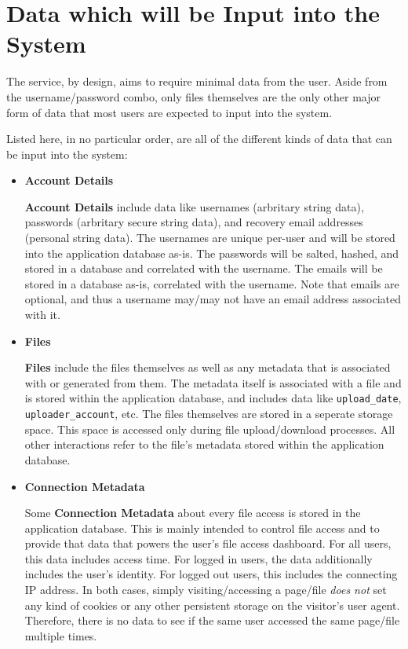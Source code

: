 \documentclass[12pt,a4paper]{report}
\begin{document}
\section{Data which will be Input into the System}\label{sec:data_which_will_be_input_into_system}
The service, by design, aims to require minimal data from the user. Aside from the username/password combo, only files themselves are the only other major form of data that most users are expected to input into the system.

Listed here, in no particular order, are all of the different kinds of data that can be input into the system:
\begin{itemize}
	\item \textbf{Account Details}

	      \textbf{Account Details} include data like usernames (arbritary string data), passwords (arbritary secure string data), and recovery email addresses (personal string data). The usernames are unique per-user and will be stored into the application database as-is. The passwords will be salted, hashed, and stored in a database and correlated with the username. The emails will be stored in a database as-is, correlated with the username. Note that emails are optional, and thus a username may/may not have an email address associated with it.

	\item \textbf{Files}

	      \textbf{Files} include the files themselves as well as any metadata that is associated with or generated from them. The metadata itself is associated with a file and is stored within the application database, and includes data like \texttt{upload\_date}, \texttt{uploader\_account}, etc. The files themselves are stored in a seperate storage space. This space is accessed only during file upload/download processes. All other interactions refer to the file's metadata stored within the application database.

	\item \textbf{Connection Metadata}

	      Some \textbf{Connection Metadata} about every file access is stored in the application database. This is mainly intended to control file access and to provide that data that powers the user's file access dashboard. For all users, this data includes access time. For logged in users, the data additionally includes the user's identity. For logged out users, this includes the connecting IP address. In both cases, simply visiting/accessing a page/file \textit{does not} set any kind of cookies or any other persistent storage on the visitor's user agent. Therefore, there is no data to see if the same user accessed the same page/file multiple times.
\end{itemize}
\end{document}

